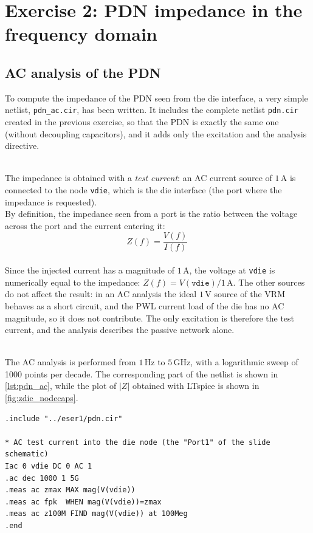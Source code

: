 \section{Exercise 2: PDN impedance in the frequency domain}


\subsection{AC analysis of the PDN}

To compute the impedance of the PDN seen from the die interface, a very simple netlist, \texttt{pdn\_ac.cir}, has been written. It includes the
complete netlist \texttt{pdn.cir} created in the previous exercise, so that the PDN is exactly the same one (without decoupling capacitors), and it
adds only the excitation and the analysis directive.

\noindent\\ The impedance is obtained with a \textit{test current}: an AC current source of $1\,\text{A}$ is connected to the node \texttt{vdie}, which
is the die interface (the port where the impedance is requested).\\ By definition, the impedance seen from a port is the ratio between the voltage across
the port and the current entering it:
\begin{equation}
  Z(f) = \frac{V(f)}{I(f)}\,
\end{equation}
\noindent\\ Since the injected current has a magnitude of $1\,\text{A}$, the voltage at \texttt{vdie} is numerically equal to the impedance:
$Z(f) = V(\texttt{vdie})/1\,\text{A}$. The other sources do not affect the result: in an AC analysis the ideal $1\,\text{V}$ source of the VRM behaves
as a short circuit, and the PWL current load of the die has no AC magnitude, so it does not contribute. The only excitation is therefore the test
current, and the analysis describes the passive network alone.

\noindent\\ The AC analysis is performed from $1\,\text{Hz}$ to $5\,\text{GHz}$, with a logarithmic sweep of 1000 points per decade. The corresponding
part of the netlist is shown in \autoref{lst:pdn_ac}, while the plot of $|Z|$ obtained with LTspice is shown in \autoref{fig:zdie_nodecaps}.

\begin{lstlisting}[language=ltspice, caption={Netlist \texttt{pdn\_ac.cir} used for the AC analysis.}, label={lst:pdn_ac}]
.include "../eser1/pdn.cir"

* AC test current into the die node (the "Port1" of the slide schematic)
Iac 0 vdie DC 0 AC 1
.ac dec 1000 1 5G
.meas ac zmax MAX mag(V(vdie))
.meas ac fpk  WHEN mag(V(vdie))=zmax
.meas ac z100M FIND mag(V(vdie)) at 100Meg
.end
\end{lstlisting}

